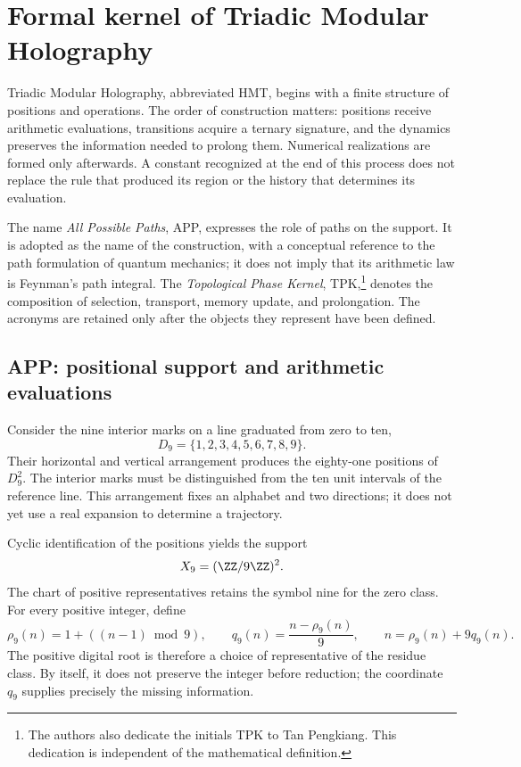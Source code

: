 \section{Formal kernel of Triadic Modular Holography}
\label{sec:nucleo}

Triadic Modular Holography, abbreviated HMT, begins with a finite structure of positions and operations. The order of construction matters: positions receive arithmetic evaluations, transitions acquire a ternary signature, and the dynamics preserves the information needed to prolong them. Numerical realizations are formed only afterwards. A constant recognized at the end of this process does not replace the rule that produced its region or the history that determines its evaluation.

The name \emph{All Possible Paths}, APP, expresses the role of paths on the support. It is adopted as the name of the construction, with a conceptual reference to the path formulation of quantum mechanics; it does not imply that its arithmetic law is Feynman's path integral. The \emph{Topological Phase Kernel}, TPK,\footnote{The authors also dedicate the initials TPK to Tan Pengkiang. This dedication is independent of the mathematical definition.} denotes the composition of selection, transport, memory update, and prolongation. The acronyms are retained only after the objects they represent have been defined.

\subsection{APP: positional support and arithmetic evaluations}
\label{subsec:nucleo-app}

Consider the nine interior marks on a line graduated from zero to ten,
\[
 D_9=\{1,2,3,4,5,6,7,8,9\}.
\]
Their horizontal and vertical arrangement produces the eighty-one positions of \(D_9^2\). The interior marks must be distinguished from the ten unit intervals of the reference line. This arrangement fixes an alphabet and two directions; it does not yet use a real expansion to determine a trajectory.

Cyclic identification of the positions yields the support
\[
 X_9=(\ZZ/9\ZZ)^2.
\]
The chart of positive representatives retains the symbol nine for the zero class. For every positive integer, define
\begin{equation}
 \rho_9(n)=1+((n-1)\bmod9),\qquad
 q_9(n)=\frac{n-\rho_9(n)}9,
 \qquad n=\rho_9(n)+9q_9(n).
 \label{eq:residuo-cociente}
\end{equation}
The positive digital root is therefore a choice of representative of the residue class. By itself, it does not preserve the integer before reduction; the coordinate \(q_9\) supplies precisely the missing information.

